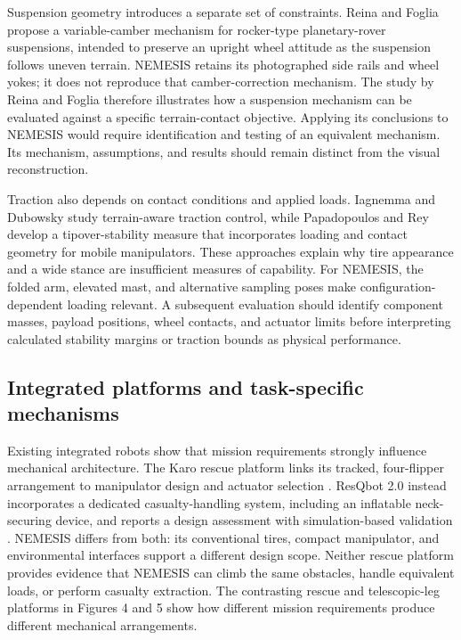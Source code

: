 \documentclass[11pt,a4paper]{article}
\begin{document}
Suspension geometry introduces a separate set of constraints. Reina and Foglia \citep{reina2010_3d6119} propose a variable-camber mechanism for rocker-type planetary-rover suspensions, intended to preserve an upright wheel attitude as the suspension follows uneven terrain. NEMESIS retains its photographed side rails and wheel yokes; it does not reproduce that camber-correction mechanism. The study by Reina and Foglia therefore illustrates how a suspension mechanism can be evaluated against a specific terrain-contact objective. Applying its conclusions to NEMESIS would require identification and testing of an equivalent mechanism. Its mechanism, assumptions, and results should remain distinct from the visual reconstruction.

Traction also depends on contact conditions and applied loads. Iagnemma and Dubowsky \citep{iagnemma2004_9f7418} study terrain-aware traction control, while Papadopoulos and Rey \citep{papadopoulos1996_3a8aa9} develop a tipover-stability measure that incorporates loading and contact geometry for mobile manipulators. These approaches explain why tire appearance and a wide stance are insufficient measures of capability. For NEMESIS, the folded arm, elevated mast, and alternative sampling poses make configuration-dependent loading relevant. A subsequent evaluation should identify component masses, payload positions, wheel contacts, and actuator limits before interpreting calculated stability margins or traction bounds as physical performance.

\FloatBarrier

\subsection{Integrated platforms and task-specific mechanisms}\label{sec:3.3}

Existing integrated robots show that mission requirements strongly influence mechanical architecture. The Karo rescue platform links its tracked, four-flipper arrangement to manipulator design and actuator selection \citep{habibian2021_bdac2f}. ResQbot 2.0 instead incorporates a dedicated casualty-handling system, including an inflatable neck-securing device, and reports a design assessment with simulation-based validation \citep{saputra2021_e81c43}. NEMESIS differs from both: its conventional tires, compact manipulator, and environmental interfaces support a different design scope. Neither rescue platform provides evidence that NEMESIS can climb the same obstacles, handle equivalent loads, or perform casualty extraction. The contrasting rescue and telescopic-leg platforms in Figures 4 and 5 show how different mission requirements produce different mechanical arrangements.
\end{document}
